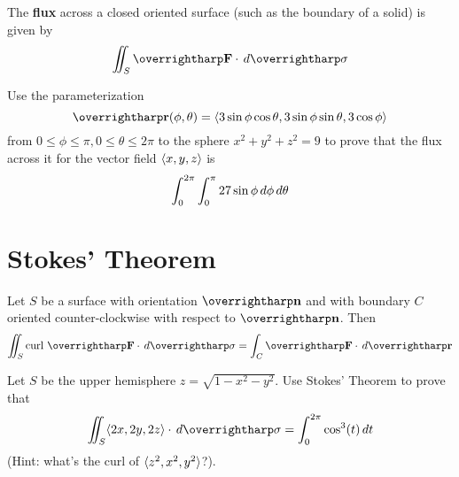 \documentclass[letterpaper, twoside, 12pt]{book}
\begin{document}
\begin{definition}
  The \textbf{flux} across a closed oriented surface (such as
  the boundary of a solid) is given by
  \[
    \iint_S \vect{F}\cdot\dvar{\vect\sigma}
  \]
\end{definition}

          \begin{problem}
            Use the parameterization
            \[
              \vect{r}(\phi,\theta)
                =
              \<
                3\sin\phi\cos\theta,
                3\sin\phi\sin\theta,
                3\cos\phi
              \>
            \]
            from $0\leq\phi\leq\pi,0\leq\theta\leq2\pi$ to the sphere
            $x^2+y^2+z^2=9$ to prove that the flux across it for the
            vector field $\langle x,y,z\rangle$ is
            \[
              \int_0^{2\pi}\int_0^\pi 27\sin\phi \,d{\phi}\,d{\theta}
            \]
          \end{problem}

          \begin{solution}

          \end{solution}

          \begin{contributors}

          \end{contributors}


\section{Stokes' Theorem}%

\begin{theorem}
  Let $S$ be a surface with orientation $\vect{n}$
  and with boundary $C$ oriented counter-clockwise with respect to $\vect{n}$.
  Then
  \[
    \iint_S \text{curl }\vect{F}\cdot\dvar{\vect\sigma}
      =
    \int_C \vect{F}\cdot\dvar{\vect{r}}
  \]
\end{theorem}

          \begin{problem}
            Let $S$ be the upper hemisphere $z=\sqrt{1-x^2-y^2}$. Use
            Stokes' Theorem to prove that
            \[
              \iint_S \<2x,2y,2z\>\cdot\dvar{\vect\sigma}
                =
              \int_0^{2\pi} \cos^3(t) \dvar{t}
            \]
            (Hint: what's the curl of $\langle z^2,x^2,y^2\rangle$?).
          \end{problem}

          \begin{solution}

          \end{solution}
\end{document}
